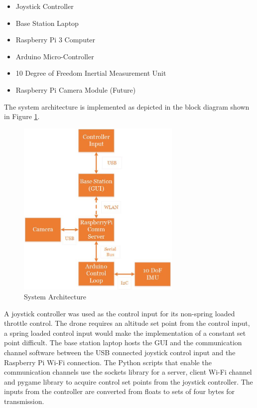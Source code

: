 \begin{itemize}
\item Joystick Controller
\item Base Station Laptop
\item Raspberry Pi 3 Computer
\item Arduino Micro-Controller
\item 10 Degree of Freedom Inertial Measurement Unit
\item Raspberry Pi Camera Module (Future)
\end{itemize}

The system architecture is implemented as depicted in the block diagram shown in Figure \ref{fig:sys_arch}. 

\begin{figure}[H]
	\centering
	\includegraphics[width=0.7\textwidth]{flowchart-architecture.jpg}
	\caption{System Architecture}
	\label{fig:sys_arch}	
\end{figure}

A joystick controller was used as the control input for its non-spring loaded throttle control. The drone requires an altitude set point from the control input, a spring loaded control input would make the implementation of a constant set point difficult. The base station laptop hosts the GUI and the communication channel software between the USB connected joystick control input and the Raspberry Pi Wi-Fi connection. The Python scripts that enable the communication channels use the sockets library for a server, client Wi-Fi channel and pygame library to acquire control set points from the joystick controller. The inputs from the controller are converted from floats to sets of four bytes for transmission.

